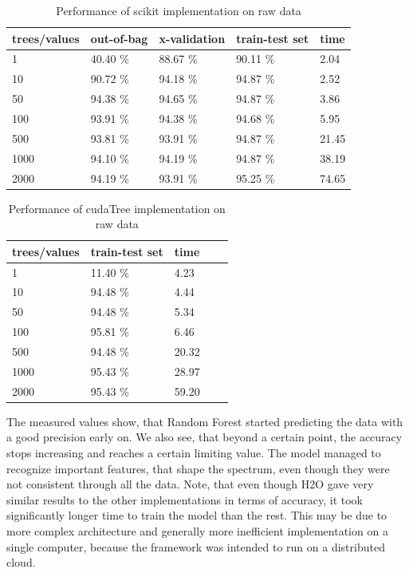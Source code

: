 \documentclass[thesis=B,english]{FITthesis}[2012/10/20]
\begin{document}
\begin{table}[h]
\begin{tabular}{|l|l|l|l|l|}
\hline
trees/values & out-of-bag & x-validation & train-test set & time \\ \hline
1            &40.40 \%           &88.67 \%              &90.11 \%                & 2.04          \\ \hline
10           &90.72 \%           &94.18 \%              &94.87 \%                &2.52           \\ \hline
50           &94.38 \%           &94.65 \%              &94.87 \%                &3.86        \\ \hline
100          &93.91 \%           &94.38 \%              &94.68 \%                &5.95        \\ \hline
500          &93.81 \%           &93.91 \%              &94.87 \%                &21.45      \\ \hline
1000         &94.10 \%           &94.19 \%              &94.87 \%                &38.19         \\ \hline
2000         &94.19 \%           &93.91 \%              &95.25 \%                &74.65        \\ \hline
\end{tabular}
\caption{Performance of scikit implementation on raw data}
\label{tab:scikit-raw}
\end{table}
\begin{table}[h]
\begin{tabular}{|l|l|l|l|l|}
\hline
trees/values & train-test set & time \\ \hline
1            & 11.40 \%              & 4.23      \\ \hline
10           & 94.48 \%              & 4.44      \\ \hline
50           & 94.48 \%              & 5.34      \\ \hline
100          & 95.81 \%              & 6.46      \\ \hline
500          & 94.48 \%              & 20.32     \\ \hline
1000         & 95.43 \%              & 28.97     \\ \hline
2000         & 95.43 \%              & 59.20     \\ \hline
\end{tabular}
\caption{Performance of cudaTree implementation on raw data}
\label{tab:cuda-raw}
\end{table}

The measured values show, that Random Forest started predicting the data with a good precision early on. We also see, that beyond a certain point, the accuracy stops increasing and reaches a certain limiting value. The model managed to recognize important features, that shape the spectrum, even though they were not consistent through all the data. Note, that even though H2O gave very similar results to the other implementations in terms of accuracy, it took significantly longer time to train the model than the rest. This may be due to more complex architecture and generally more inefficient implementation on a single computer, because the framework was intended to run on a distributed cloud. 
\end{document}
